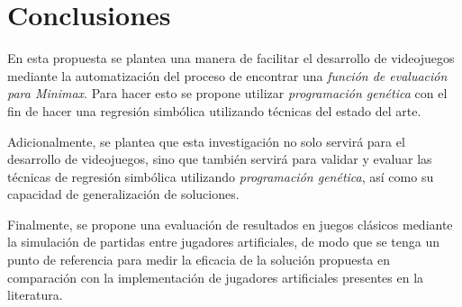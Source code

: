 \section{Conclusiones}
  En esta propuesta se plantea una manera de facilitar el desarrollo de videojuegos mediante la 
  automatización del proceso de encontrar una \textit{función de evaluación para Minimax}.
  Para hacer esto se propone utilizar \textit{programación genética} con el fin de hacer una 
  regresión simbólica utilizando técnicas del estado del arte.

  Adicionalmente, se plantea que esta investigación no solo servirá para el desarrollo de 
  videojuegos, sino que también servirá para validar y evaluar las técnicas de regresión simbólica
  utilizando \textit{programación genética}, así como su capacidad de generalización de soluciones.

  Finalmente, se propone una evaluación de resultados en juegos clásicos mediante la simulación de 
  partidas entre jugadores artificiales, de modo que se tenga un punto de referencia para medir la
  eficacia de la solución propuesta en comparación con la implementación de jugadores artificiales
  presentes en la literatura.